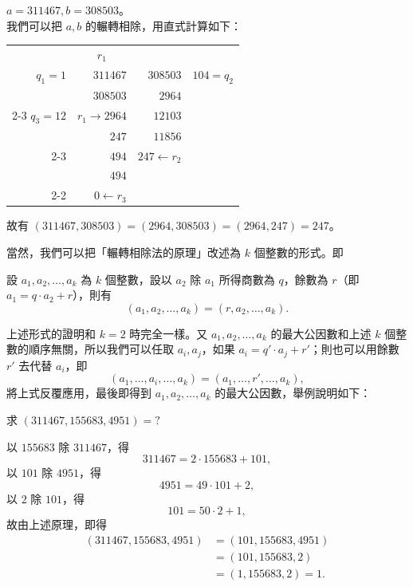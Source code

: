 \begin{example}\label{ex:6-2-3}
$a=311467, b=308503$。\\
我們可以把 $a, b$ 的輾轉相除，用直式計算如下：
\begin{center}
\renewcommand{\arraystretch}{1.2}
\begin{tabular}{r|r|r|l}
\multicolumn{1}{c}{} & \multicolumn{1}{c}{$r_1$} & \multicolumn{1}{c}{} & \\
$q_1 = 1$ & $311467$ & $308503$ & $104 = q_2$ \\
          & $308503$ & $2964$   & \\ \cline{2-3}
$q_3 = 12$ & $r_1 \rightarrow 2964$ & $12103$ & \\
          & $247$    & $11856$  & \\ \cline{2-3}
          & $494$    & $247 \leftarrow r_2$ & \\
          & $494$    &          & \\ \cline{2-2}
          & $0 \leftarrow r_3$ & &
\end{tabular}
\end{center}
故有 $(311467, 308503) = (2964, 308503) = (2964, 247) = 247$。
\end{example}

當然，我們可以把「輾轉相除法的原理」改述為 $k$ 個整數的形式。即

設 $a_1, a_2, \dots, a_k$ 為 $k$ 個整數，設以 $a_2$ 除 $a_1$ 所得商數為 $q$，餘數為 $r$（即 $a_1 = q \cdot a_2 + r$），則有
\begin{equation*}
  (a_1, a_2, \dots, a_k) = (r, a_2, \dots, a_k).
\end{equation*}

上述形式的證明和 $k=2$ 時完全一樣。又 $a_1, a_2, \dots, a_k$ 的最大公因數和上述 $k$ 個整數的順序無關，所以我們可以任取 $a_i, a_j$，如果 $a_i = q' \cdot a_j + r'$；則也可以用餘數 $r'$ 去代替 $a_i$，即
\begin{equation*}
  (a_1, \dots, a_i, \dots, a_k) = (a_1, \dots, r', \dots, a_k),
\end{equation*}
將上式反覆應用，最後即得到 $a_1, a_2, \dots, a_k$ 的最大公因數，舉例說明如下：

\begin{example}\label{ex:6-2-4}
求 $(311467, 155683, 4951) = ?$

以 $155683$ 除 $311467$，得
\begin{equation*}
  311467 = 2 \cdot 155683 + 101,
\end{equation*}
以 $101$ 除 $4951$，得
\begin{equation*}
  4951 = 49 \cdot 101 + 2,
\end{equation*}
以 $2$ 除 $101$，得
\begin{equation*}
  101 = 50 \cdot 2 + 1,
\end{equation*}
故由上述原理，即得
\begin{align*}
  (311467, 155683, 4951) &= (101, 155683, 4951) \\
  &= (101, 155683, 2) \\
  &= (1, 155683, 2) = 1.
\end{align*}
\end{example}

